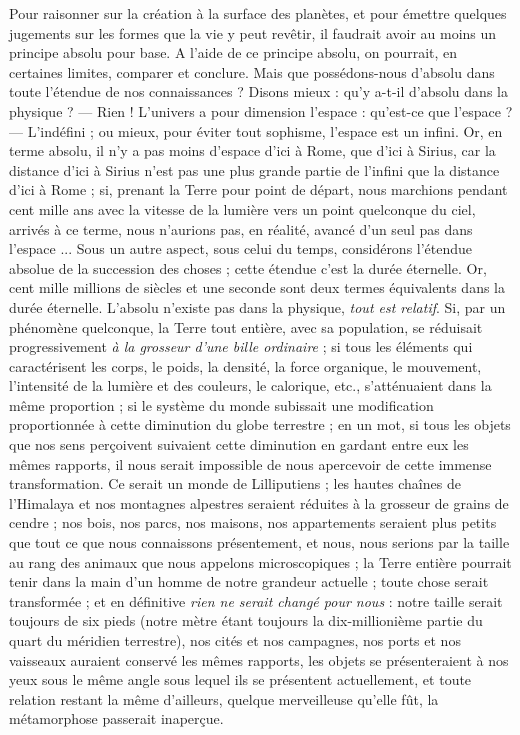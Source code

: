 \documentclass[a4paper, 11pt, oneside, landscape]{article}
\begin{document}
Pour raisonner sur la création à la surface des planètes, et pour émettre quelques jugements sur les formes que la vie y peut revêtir, il faudrait avoir au moins un principe absolu pour base. A l'aide de ce principe absolu, on pourrait, en certaines limites, comparer et conclure. Mais que possédons-nous d'absolu dans toute l'étendue de nos connaissances ? Disons mieux : qu'y a-t-il d'absolu dans la physique ? --- Rien ! L'univers a pour dimension l'espace : qu'est-ce que l'espace ? --- L'indéfini ; ou mieux, pour éviter tout sophisme, l'espace est un infini. Or, en terme absolu, il n'y a pas moins d'espace d'ici à Rome, que d'ici à Sirius, car la distance d'ici à Sirius n'est pas une plus grande partie de l'infini que la distance d'ici à Rome ; si, prenant la Terre pour point de départ, nous marchions pendant cent mille ans avec la vitesse de la lumière vers un point quelconque du ciel, arrivés à ce terme, nous n'aurions pas, en réalité, avancé d'un seul pas dans l'espace ... Sous un autre aspect, sous celui du temps, considérons l'étendue absolue de la succession des choses ; cette étendue c'est la durée éternelle. Or, cent mille millions de siècles et une seconde sont deux termes équivalents dans la durée éternelle. L'absolu n'existe pas dans la physique, \emph{tout est relatif}. Si, par un phénomène quelconque, la Terre tout entière, avec sa population, se réduisait progressivement \emph{à la grosseur d'une bille ordinaire} ; si tous les éléments qui caractérisent les corps, le poids, la densité, la force organique, le mouvement, l'intensité de la lumière et des couleurs, le calorique, etc., s'atténuaient dans la même proportion ; si le système du monde subissait une modification proportionnée à cette diminution du globe terrestre ; en un mot, si tous les objets que nos sens perçoivent suivaient cette diminution en gardant entre eux les mêmes rapports, il nous serait impossible de nous apercevoir de cette immense transformation. Ce serait un monde de Lilliputiens ; les hautes chaînes de l'Himalaya et nos montagnes alpestres seraient réduites à la grosseur de grains de cendre ; nos bois, nos parcs, nos maisons, nos appartements seraient plus petits que tout ce que nous connaissons présentement, et nous, nous serions par la taille au rang des animaux que nous appelons microscopiques ; la Terre entière pourrait tenir dans la main d'un homme de notre grandeur actuelle ; toute chose serait transformée ; et en définitive \emph{rien ne serait changé pour nous} : notre taille serait toujours de six pieds (notre mètre étant toujours la dix-millionième partie du quart du méridien terrestre), nos cités et nos campagnes, nos ports et nos vaisseaux auraient conservé les mêmes rapports, les objets se présenteraient à nos yeux sous le même angle sous lequel ils se présentent actuellement, et toute relation restant la même d'ailleurs, quelque merveilleuse qu'elle fût, la métamorphose passerait inaperçue.
\end{document}
